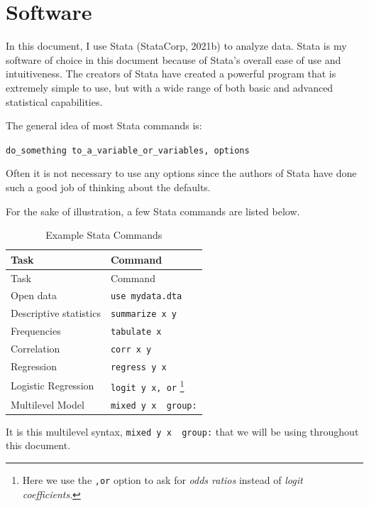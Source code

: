 \documentclass[
  letterpaper,
  DIV=11,
  numbers=noendperiod]{scrreprt}
\begin{document}

\hypertarget{sec-software}{%
\chapter{Software}\label{sec-software}}

In this document, I use Stata (StataCorp, 2021b) to analyze data. Stata
is my software of choice in this document because of Stata's overall
ease of use and intuitiveness. The creators of Stata have created a
powerful program that is extremely simple to use, but with a wide range
of both basic and advanced statistical capabilities.

The general idea of most Stata commands is:

\texttt{do\_something\ to\_a\_variable\_or\_variables,\ options}

Often it is not necessary to use any options since the authors of Stata
have done such a good job of thinking about the defaults.

For the sake of illustration, a few Stata commands are listed below.

\hypertarget{tbl-Statacommands}{}
\begin{longtable}[]{@{}ll@{}}
\caption{\label{tbl-Statacommands}Example Stata Commands}\tabularnewline
\toprule()
Task & Command \\
\midrule()
\endfirsthead
\toprule()
Task & Command \\
\midrule()
\endhead
Open data & \texttt{use\ mydata.dta} \\
Descriptive statistics & \texttt{summarize\ x\ y} \\
Frequencies & \texttt{tabulate\ x} \\
Correlation & \texttt{corr\ x\ y} \\
Regression & \texttt{regress\ y\ x} \\
Logistic Regression & \texttt{logit\ y\ x,\ or} \footnote{Here we use
  the \texttt{,or} option to ask for \emph{odds ratios} instead of
  \emph{logit coefficients}.} \\
Multilevel Model & \texttt{mixed\ y\ x\ \textbar{}\textbar{}\ group:} \\
\bottomrule()
\end{longtable}

It is this multilevel syntax,
\texttt{mixed\ y\ x\ \textbar{}\textbar{}\ group:} that we will be using
throughout this document.

\end{document}
